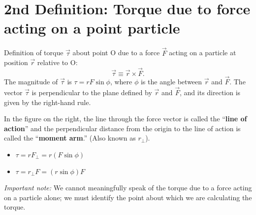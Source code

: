 \documentclass[11pt, letterpaper, openany]{book}
\begin{document}
\section*{2nd Definition: Torque due to force acting on a point particle}

Definition of torque $\vec{\tau}$ about point O due to a force $\vec{F}$ acting on a particle at position $\vec{r}$ relative to O:
\[ \vec{\tau} \equiv \vec{r} \times \vec{F}. \]
The magnitude of $\vec{\tau}$ is $\tau = rF \sin\phi$, where $\phi$ is the angle between $\vec{r}$ and $\vec{F}$. The vector $\vec{\tau}$ is perpendicular to the plane defined by $\vec{r}$ and $\vec{F}$, and its direction is given by the right-hand rule.

In the figure on the right, the line through the force vector is called the ``\textbf{line of action}'' and the perpendicular distance from the origin to the line of action is called the ``\textbf{moment arm}.'' (Also known as $r_\perp$).
\begin{itemize}
    \item $\tau = r F_\perp = r(F\sin\phi)$
    \item $\tau = r_\perp F = (r\sin\phi)F$
\end{itemize}
\textit{Important note:} We cannot meaningfully speak of the torque due to a force acting on a particle alone; we must identify the point about which we are calculating the torque.
\end{document}
